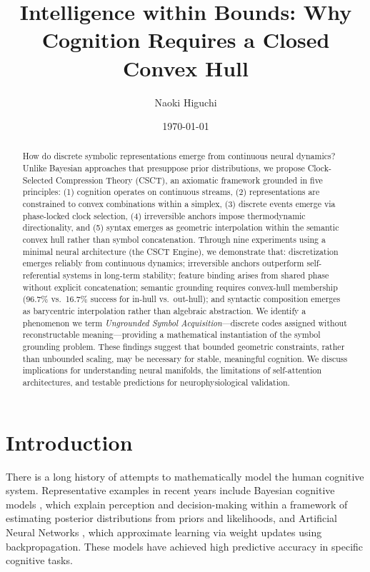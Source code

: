 \documentclass{article}
\title{\textbf{Intelligence within Bounds: Why Cognition Requires a Closed Convex Hull}}
\author{Naoki Higuchi}
\affil{CSCT-NAIL (CSCT Neuro-AI Lab), Tokyo, Japan}
\affil{\texttt{contact@csct-nail.com}}
\affil{Code available at: \url{https://github.com/CSCT-NAIL/CSCT}}
\affil{Software DOI: \href{https://doi.org/10.5281/zenodo.18382368}{10.5281/zenodo.18382368}}
\date{\today}
\begin{document}
\maketitle

\begin{abstract}
How do discrete symbolic representations emerge from continuous neural dynamics?
Unlike Bayesian approaches that presuppose prior distributions, we propose Clock-Selected Compression Theory (CSCT), an axiomatic framework grounded in five principles: (1) cognition operates on continuous streams, (2) representations are constrained to convex combinations within a simplex, (3) discrete events emerge via phase-locked clock selection, (4) irreversible anchors impose thermodynamic directionality, and (5) syntax emerges as geometric interpolation within the semantic convex hull rather than symbol concatenation.
Through nine experiments using a minimal neural architecture (the CSCT Engine), we demonstrate that: discretization emerges reliably from continuous dynamics; irreversible anchors outperform self-referential systems in long-term stability; feature binding arises from shared phase without explicit concatenation; semantic grounding requires convex-hull membership (96.7\% vs.\ 16.7\% success for in-hull vs.\ out-hull); and syntactic composition emerges as barycentric interpolation rather than algebraic abstraction.
We identify a phenomenon we term \emph{Ungrounded Symbol Acquisition}---discrete codes assigned without reconstructable meaning---providing a mathematical instantiation of the symbol grounding problem.
These findings suggest that bounded geometric constraints, rather than unbounded scaling, may be necessary for stable, meaningful cognition.
We discuss implications for understanding neural manifolds, the limitations of self-attention architectures, and testable predictions for neurophysiological validation.
\end{abstract}

\section{Introduction}

There is a long history of attempts to mathematically model the human cognitive system. Representative examples in recent years include Bayesian cognitive models \cite{knill2004bayesian, tenenbaum2011grow}, which explain perception and decision-making within a framework of estimating posterior distributions from priors and likelihoods, and Artificial Neural Networks \cite{rumelhart1986learning, lecun2015deep}, which approximate learning via weight updates using backpropagation. These models have achieved high predictive accuracy in specific cognitive tasks.
\end{document}
